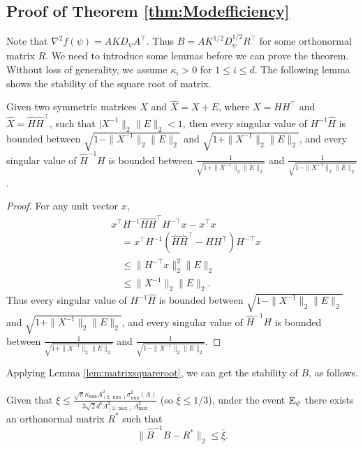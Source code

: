 \subsection{Proof of Theorem \ref{thm:Modefficiency}}
\label{subsec:ProofModEff}
Note that $\nabla^2f(\psi) = AKD_{\psi}A^{\top}$. Thus $B = AK^{1/2}D_{\psi}^{1/2}R^{\top}$ for some orthonormal matrix $R$. 
We need to introduce some lemmas before we can prove the theorem. Without loss of generality, we assume $\kappa_i>0$ for $1\le i \le d$.
The following lemma shows the stability of the square root of matrix.
\begin{lemma}
\label{lem:matrixsquareroot}
Given two symmetric matrices $X$ and $\widehat{X} = X + E$, where $X = HH^{\top}$ and $\widehat{X} = \widehat{H}\widehat{H}^{\top}$, such that $|X^{-1}\|_2 \|E\|_2 < 1$, then every singular value of $H^{-1}\widehat{H}$ is bounded between $\sqrt{1- \|X^{-1}\|_2 \|E\|_2}$ and $\sqrt{1+ \|X^{-1}\|_2 \|E\|_2}$, 
and every singular value of $\widehat{H}^{-1}H$ is bounded between $\frac{1}{\sqrt{1 + \|X^{-1}\|_2 \|E\|_2}}$ and $\frac{1}{\sqrt{1 - \|X^{-1}\|_2 \|E\|_2}}$. 
\end{lemma}
\begin{proof}
For any unit vector $x$,
\begin{align*}
& x^{\top}H^{-1}\widehat{H}\widehat{H}^{\top}H^{-\top}x - x^{\top}x\\
& \quad = x^{\top}H^{-1}\left( \widehat{H}\widehat{H}^{\top} - HH^{\top}\right)H^{-\top}x \\
& \quad \le \|H^{-\top}x\|^2_2 \|E\|_2 \\
& \quad \le \|X^{-1}\|_2 \|E\|_2.
\end{align*}
Thus every singular value of $H^{-1}\widehat{H}$ is bounded between $\sqrt{1- \|X^{-1}\|_2 \|E\|_2}$ and $\sqrt{1+ \|X^{-1}\|_2 \|E\|_2}$, 
and every singular value of $\widehat{H}^{-1}H$ is bounded between $\frac{1}{\sqrt{1 + \|X^{-1}\|_2 \|E\|_2}}$ and $\frac{1}{\sqrt{1 - \|X^{-1}\|_2 \|E\|_2}}$.
\end{proof}
Applying Lemma \ref{lem:matrixsquareroot}, we can get the stability of $B$, as follows.
\begin{lemma}
\label{lem:BhatinverseB}
Given that $\xi \le \frac{\sqrt{\pi}\kappa_{\min}A^2_{(2,\min)}\sigma_{\min}^2(A)}{3\sqrt{2}d^6A_{(2,\max)}^2A_{\max}^2}$
(so $\bar{\xi} \le 1/3$), under the event $\mathbb{E}_{\psi}$ there exists an orthonormal matrix $R^*$ such that 
\[
\|\widehat{B}^{-1}B - R^*\|_2 \le \bar{\xi}.
\]
\end{lemma}
